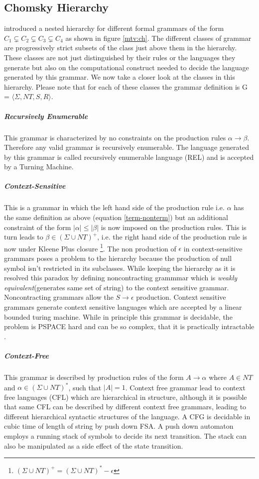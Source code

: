 \subsection{Chomsky Hierarchy}\label{flt:ch}
\cite{Chomsky1956} introduced a nested hierarchy for different formal grammars of the form $C_1 \subsetneq C_2 \subsetneq C_3 \subsetneq C_4$ as shown in figure \ref{mtv:ch}. The different classes of grammar are progressively strict subsets of the class just above them in the hierarchy. These classes are not just distinguished by their rules or the languages they generate but also on the computational construct needed to decide the language generated by this grammar. We now take a closer look at the classes in this hierarchy. Please note that for each of these classes the grammar definition is G = $\langle \Sigma, NT, S, R \rangle$.
\subparagraph{Recursively Enumerable} This grammar is characterized by no constraints on the production rules $\alpha \rightarrow \beta$. Therefore any valid grammar is recursively enumerable. The language generated by this grammar is called recursively enumerable language (REL) and is accepted by a Turning Machine.
\subparagraph{Context-Sensitive} This is a grammar in which the left hand side of the production rule i.e. $\alpha$ has the same definition as above (equation \ref{term-nonterm}) but an additional constraint of the form $|\alpha| \leq |\beta|$ is now imposed on the production rules. This is turn leads to $\beta \in (\Sigma \cup NT)^{+}$, i.e. the right hand side of the production rule is now under Kleene Plus closure \footnote{$(\Sigma \cup NT)^{+} = (\Sigma \cup NT)^{*} - \epsilon$}. The non production of $\epsilon$ in context-sensitive grammars poses a problem to the hierarchy because the production of null symbol isn't restricted in its subclasses. While keeping the hierarchy as it is \cite{Chomsky1963} resolved this paradox by defining noncontracting grammmar which is \textit{weakly equivalent}(generates same set of string) to the context sensitive grammar. Noncontracting grammars allow the $S \rightarrow \epsilon$ production. Context sensitive grammars generate context sensitive languages which are accepted by a linear bounded turing machine. While in principle this grammar is decidable, the problem is PSPACE hard and can be so complex, that it is practically intractable \citep{Jager2012}. 
\subparagraph{Context-Free} This grammar is described by production rules of the form $A \rightarrow \alpha$ where $A \in NT$ and $\alpha \in (\Sigma \cup NT)^{*}$, such that $|A|=1$.  Context free grammar lead to context free languages (CFL) which are hierarchical in structure, although it is possible that same CFL can be described by different context free grammars, leading to different hierarchical syntactic structures of the language. A CFG is decidable in cubic time of length of string by push down FSA. A push down automaton employs a running stack of symbols to decide its next transition. The stack can also be manipulated as a side effect of the state transition.

